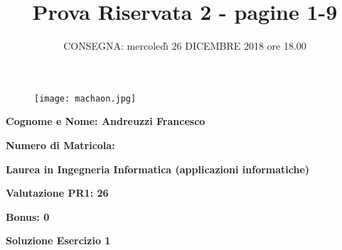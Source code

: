 \documentclass[11pt,reqno]{amsart}
\title{Prova Riservata 2 -  pagine 1-9}
\author{CONSEGNA: mercoled\`{\i} 26 DICEMBRE 2018 ore 18.00}
\begin{document}
\maketitle

\begin{figure}[ht!]
\centering
\texttt{[image: machaon.jpg]}
\end{figure}

{\bf Cognome e Nome: Andreuzzi Francesco}

\bigskip
{\bf Numero di Matricola: }

\bigskip
{\bf Laurea in Ingegneria Informatica (applicazioni informatiche)}

\bigskip
{\bf Valutazione PR1: 26}

\bigskip
{\bf Bonus: 0}



\bigskip


\bigskip

\newpage

\centerline{\bf Soluzione Esercizio 1 }
\bigskip
\end{document}
